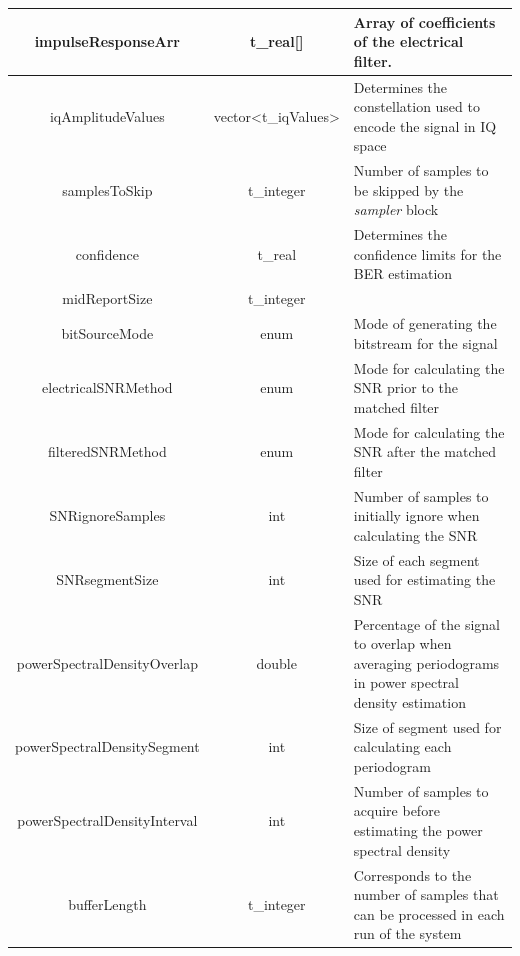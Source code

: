 \begin{longtable}[h]{|c|c|p{5cm}|}
		impulseResponseArr            & t\_real[]
																	& Array of coefficients of the electrical
																	filter. \\\hline
		iqAmplitudeValues             & vector<t\_iqValues>
																	& Determines the constellation used to encode
																	the signal in IQ space \\\hline
		samplesToSkip                 & t\_integer
																	& Number of samples to be skipped by the
																	\textit{sampler} block     \\ \hline
		confidence                    & t\_real
																	& Determines the confidence limits for the BER
																	estimation     \\ \hline
		midReportSize                 & t\_integer
																	&      \\ \hline
		bitSourceMode                 & enum
																	& Mode of generating the bitstream for the
																	signal	\\\hline
		electricalSNRMethod           & enum
																	& Mode for calculating the SNR prior to the
																	matched filter	\\\hline
		filteredSNRMethod             & enum
																	& Mode for calculating the SNR after the
																	matched filter	\\\hline
		SNRignoreSamples              & int
																	& Number of samples to initially ignore when
																	calculating the SNR \\\hline
		SNRsegmentSize                & int
																	& Size of each segment used for estimating the
																	SNR \\\hline
		powerSpectralDensityOverlap   & double
																	& Percentage of the signal to overlap when
																	averaging periodograms in power spectral
																	density estimation \\\hline
		powerSpectralDensitySegment   & int
																	& Size of segment used for calculating each
																	periodogram \\\hline
		powerSpectralDensityInterval  & int
																	& Number of samples to acquire before
																	estimating the power spectral density \\\hline
		bufferLength                  & t\_integer
																	& Corresponds to the number of samples that
																	can be processed in each run of the system
																	\\ \hline
	\end{longtable}

